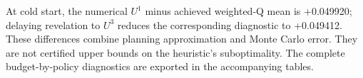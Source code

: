 At cold start, the numerical $U^1$ minus achieved weighted-Q mean is +0.049920; delaying revelation to $U^3$ reduces the corresponding diagnostic to +0.049412. These differences combine planning approximation and Monte Carlo error. They are not certified upper bounds on the heuristic's suboptimality. The complete budget-by-policy diagnostics are exported in the accompanying tables.
